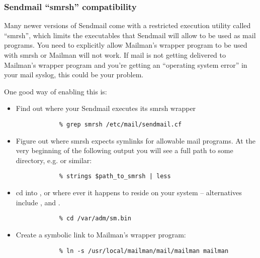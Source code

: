 \documentclass{howto}
\begin{document}
\subsubsection{Sendmail ``smrsh'' compatibility}

Many newer versions of Sendmail come with a restricted execution utility
called ``smrsh'', which limits the executables that Sendmail will allow to be
used as mail programs.  You need to explicitly allow Mailman's wrapper program
to be used with smrsh or Mailman will not work.  If mail is not getting
delivered to Mailman's wrapper program and you're getting an ``operating
system error'' in your mail syslog, this could be your problem.

One good way of enabling this is:

\begin{itemize}
    \item Find out where your Sendmail executes its smrsh wrapper

          \begin{verbatim}
            % grep smrsh /etc/mail/sendmail.cf
          \end{verbatim}

    \item Figure out where smrsh expects symlinks for allowable mail
          programs.  At the very beginning of the following output you will
          see a full path to some directory, e.g.  or
          similar:

          \begin{verbatim}
            % strings $path_to_smrsh | less
          \end{verbatim}

    \item cd into , or where ever it happens to reside
          on your system -- alternatives include ,
           and .

          \begin{verbatim}
            % cd /var/adm/sm.bin
          \end{verbatim}

    \item Create a symbolic link to Mailman's wrapper program:

          \begin{verbatim}
            % ln -s /usr/local/mailman/mail/mailman mailman
          \end{verbatim}
\end{itemize}
\end{document}
